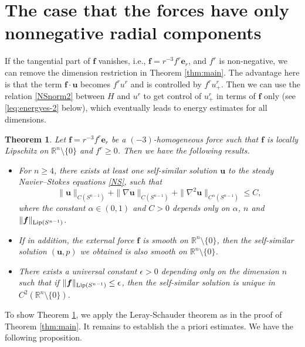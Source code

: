 \documentclass[12pt]{amsart}
\newtheorem{theorem}{Theorem}[section]
\newcommand{\Bu}{{\boldsymbol{u}}}
\newcommand{\Be}{{\boldsymbol{e}}}
\newcommand{\Bf}{{\boldsymbol{f}}}
\begin{document}
\section{The case that the forces have only nonnegative radial components}\label{Section4}
If the tangential part of $\Bf$ vanishes, i.e., $ \Bf = r^{-3}f^r\Be_r$, and $f^r$ is non-negative, we can remove the dimension restriction  in Theorem \ref{thm:main}. The advantage here is that the term $\Bf\cdot \Bu$ becomes $f^ru^r$ and is controlled by $f^ru^r_+$. Then we can use the relation \eqref{NSnorm2} between $H$ and $u^r$   to get  control of $u^r_+$ in terms of $\Bf$ only (see \eqref{leq:energyes-2} below), which eventually leads to energy estimates for all dimensions.
\begin{theorem}
	\label{thm:main2}
	Let $\Bf=r^{-3}f^r \Be_{r}$ be a $(-3)$-homogeneous force  such that $\Bf$ is locally Lipschitz on $\mathbb{R}^n\setminus \{0\}$ and $f^r \geq 0$.  Then we have the following results. 
	\begin{itemize}
		\item[(i)]  For $n\geq 4$, 
		there exists at least one  self-similar solution $\Bu$  to the steady Navier–Stokes equations \eqref{NS}, such that 
		\begin{equation*}
			\|\Bu\|_{C(S^{n-1})} + 	 	\|\nabla \Bu\|_{C(S^{n-1})} + \|\nabla^2 \Bu\|_{C^{\alpha}(S^{n-1})} \leq C,
		\end{equation*}
		where the constant $\alpha\in(0,1)$ and  $C > 0$ depends only on $\alpha$, $n$ and  $\|\Bf\|_{\textnormal{Lip}(S^{n-1})}$.
		\item[(ii)] If in addition, the external force $\Bf$ is smooth on $\mathbb{R}^n \setminus \{0\}$, then 
		the self-similar solution $(\Bu, p)$  we obtained is also smooth on  $\mathbb{R}^n \setminus \{0\}$. 
		\item[(iii)]
		There exists a universal constant $\epsilon>0$ depending only on the dimension $n$ such that if  $\|\Bf\|_ {\textnormal{Lip}(S^{n-1})}\leq \epsilon$, then the self-similar solution is unique in $C^{2}(\mathbb{R}^n \setminus \{0\})$.
	\end{itemize}
	
\end{theorem}
To show Theorem \ref{thm:main2}, we apply the Leray-Schauder theorem as  in the proof of Theorem \ref{thm:main}. It remains to establish the a priori estimates. We have the following  proposition.
\end{document}

